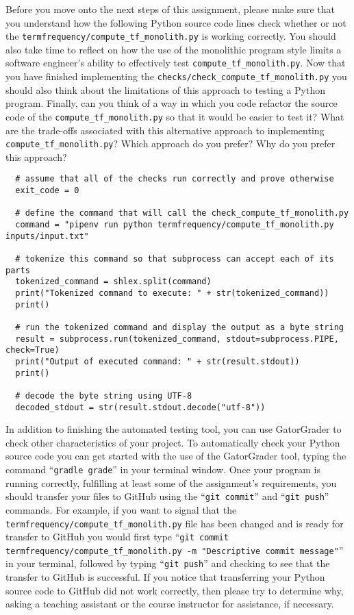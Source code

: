 \documentclass[11pt]{article}
\newcommand{\mainprogram}{\lstinline{compute_tf_monolith.py}}
\newcommand{\mainprogramsource}{\lstinline{termfrequency/compute_tf_monolith.py}}
\newcommand{\checkprogramsource}{\lstinline{checks/check_compute_tf_monolith.py}}
\newcommand{\gatorgraderstart}{\command{gradle grade}}
\newcommand{\gitcommit}{\command{git commit}}
\newcommand{\gitpush}{\command{git push}}
\newcommand{\gitcommitmainprogram}{\command{git commit termfrequency/compute_tf_monolith.py -m "Descriptive commit message"}}
\newcommand{\command}[1]{``\lstinline{#1}''}
\begin{document}
Before you move onto the next steps of this assignment, please make sure that
you understand how the following Python source code lines check whether or not
the \mainprogramsource{} is working correctly. You should also take time to
reflect on how the use of the monolithic program style limits a software
engineer's ability to effectively test \mainprogram. Now that you have finished
implementing the \checkprogramsource{} you should also think about the
limitations of this approach to testing a Python program. Finally, can you think
of a way in which you code refactor the source code of the \mainprogram{} so
that it would be easier to test it? What are the trade-offs associated with this
alternative approach to implementing \mainprogram? Which approach do you prefer?
Why do you prefer this approach?

\begin{verbatim}
  # assume that all of the checks run correctly and prove otherwise
  exit_code = 0

  # define the command that will call the check_compute_tf_monolith.py
  command = "pipenv run python termfrequency/compute_tf_monolith.py inputs/input.txt"

  # tokenize this command so that subprocess can accept each of its parts
  tokenized_command = shlex.split(command)
  print("Tokenized command to execute: " + str(tokenized_command))
  print()

  # run the tokenized command and display the output as a byte string
  result = subprocess.run(tokenized_command, stdout=subprocess.PIPE, check=True)
  print("Output of executed command: " + str(result.stdout))
  print()

  # decode the byte string using UTF-8
  decoded_stdout = str(result.stdout.decode("utf-8"))
\end{verbatim}

In addition to finishing the automated testing tool, you can use GatorGrader to
check other characteristics of your project. To automatically check your Python
source code you can get started with the use of the GatorGrader tool, typing the
command \gatorgraderstart{} in your terminal window.
%
Once your program is running correctly, fulfilling at least some of the
assignment's requirements, you should transfer your files to GitHub using the
\gitcommit{} and \gitpush{} commands. For example, if you want to signal that
the \mainprogramsource{} file has been changed and is ready for transfer to
GitHub you would first type \gitcommitmainprogram{} in your terminal, followed
by typing \gitpush{} and checking to see that the transfer to GitHub is
successful. If you notice that transferring your Python source code to GitHub
did not work correctly, then please try to determine why, asking a teaching
assistant or the course instructor for assistance, if necessary.
\end{document}
